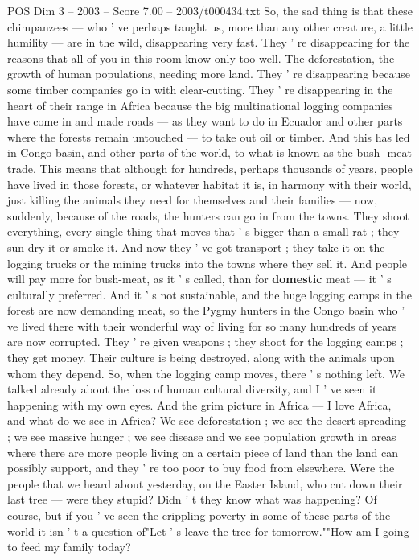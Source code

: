 \begin{textsample}{POS Dim 3 – 2003 – Score 7.00 – 2003/t000434.txt}
So, the sad thing is that these chimpanzees — who ' ve perhaps taught us, more than any other creature, a little humility — are in the wild, disappearing very fast.
They ' re disappearing for the reasons that all of you in this room know only too well.
The deforestation, the growth of human populations, needing more land.
They ' re disappearing because some timber companies go in with clear-cutting.
They ' re disappearing in the heart of their range in Africa because the big multinational logging companies have come in and made roads — as they want to do in Ecuador and other parts where the forests remain untouched — to take out oil or timber.
And this has led in Congo basin, and other parts of the world, to what is known as the bush- meat trade.
This means that although for hundreds, perhaps thousands of years, people have lived in those forests, or whatever habitat it is, in harmony with their world, just killing the animals they need for themselves and their families — now, suddenly, because of the roads, the hunters can go in from the towns.
They shoot everything, every single thing that moves that ' s bigger than a small rat ; they sun-dry it or smoke it.
And now they ' ve got transport ; they take it on the logging trucks or the mining trucks into the towns where they sell it.
And people will pay more for bush-meat, as it ' s called, than for \textbf{domestic} meat — it ' s culturally preferred.
And it ' s not sustainable, and the huge logging camps in the forest are now demanding meat, so the Pygmy hunters in the Congo basin who ' ve lived there with their wonderful way of living for so many hundreds of years are now corrupted.
They ' re given weapons ; they shoot for the logging camps ; they get money.
Their culture is being destroyed, along with the animals upon whom they depend.
So, when the logging camp moves, there ' s nothing left.
We talked already about the loss of human cultural diversity, and I ' ve seen it happening with my own eyes.
And the grim picture in Africa — I love Africa, and what do we see in Africa?
We see deforestation ; we see the desert spreading ; we see massive hunger ; we see disease and we see population growth in areas where there are more people living on a certain piece of land than the land can possibly support, and they ' re too poor to buy food from elsewhere.
Were the people that we heard about yesterday, on the Easter Island, who cut down their last tree — were they stupid?
Didn ' t they know what was happening?
Of course, but if you ' ve seen the crippling poverty in some of these parts of the world it isn ' t a question of"Let ' s leave the tree for tomorrow.""How am I going to feed my family today?

\end{textsample}
